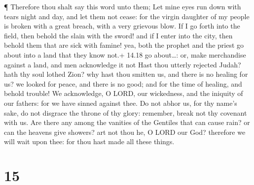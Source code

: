  ¶ Therefore thou shalt say this word unto them; Let mine
eyes run down with tears night and day, and let them not cease: for the
virgin daughter of my people is broken with a great breach, with a very
grievous blow.  If I go forth into the field, then behold
the slain with the sword! and if I enter into the city, then behold them
that are sick with famine! yea, both the prophet and the priest go about
into a land that they know not.+ 14.18 go about\ldots: or, make
merchandise against a land, and men acknowledge it not 
Hast thou utterly rejected Judah? hath thy soul lothed Zion? why hast
thou smitten us, and there is no healing for us? we looked for peace,
and there is no good; and for the time of healing, and behold trouble!
 We acknowledge, O LORD, our wickedness, and the iniquity
of our fathers: for we have sinned against thee.  Do not
abhor us, for thy name's sake, do not disgrace the throne of thy glory:
remember, break not thy covenant with us.  Are there any
among the vanities of the Gentiles that can cause rain? or can the
heavens give showers? art not thou he, O LORD our God? therefore we will
wait upon thee: for thou hast made all these things.

\hypertarget{section-14}{%
\section{15}\label{section-14}}

